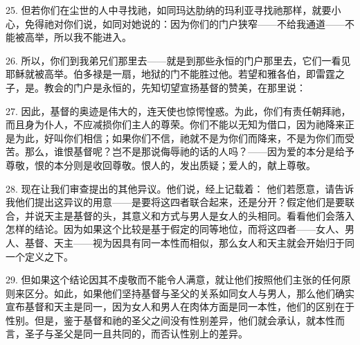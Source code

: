 25. 但若你们在尘世的人中寻找祂，如同玛达肋纳的玛利亚寻找祂那样，就要小心，免得祂对你们说，如同对她说的：因为你们的门户狭窄——不给我通道——不能被高举，所以我不能进入。\par

26. 所以，你们到我弟兄们那里去——就是到那些永恒的门户那里去，它们一看见耶稣就被高举。伯多禄是一扇，地狱的门不能胜过他。若望和雅各伯，即雷霆之子，是。教会的门户是永恒的，先知切望宣扬基督的赞美，在那里说：\par

27. 因此，基督的奥迹是伟大的，连天使也惊愕惶惑。为此，你们有责任朝拜祂，而且身为仆人，不应减损你们主人的尊荣。你们不能以无知为借口，因为祂降来正是为此，好叫你们相信；如果你们不信，祂就不是为你们而降来，不是为你们而受苦。那么，谁恨基督呢？岂不是那说侮辱祂的话的人吗？——因为爱的本分是给予尊敬，恨的本分则是收回尊敬。恨人的，发出质疑；爱人的，献上尊敬。\par

\par

28. 现在让我们审查提出的其他异议。他们说，经上记载着：  他们若愿意，请告诉我他们提出这异议的用意——是要将这四者联合起来，还是分开？假定他们是要联合，并说天主是基督的头，其意义和方式与男人是女人的头相同。看看他们会落入怎样的结论。因为如果这个比较是基于假定的同等地位，而将这四者——女人、男人、基督、天主——视为因具有同一本性而相似，那么女人和天主就会开始归于同一个定义之下。\par

29. 但如果这个结论因其不虔敬而不能令人满意，就让他们按照他们主张的任何原则来区分。如此，如果他们坚持基督与圣父的关系如同女人与男人，那么他们确实宣布基督和天主是同一，因为女人和男人在肉体方面是同一本性，他们的区别在于性别。但是，鉴于基督和祂的圣父之间没有性别差异，他们就会承认，就本性而言，圣子与圣父是同一且共同的，而否认性别上的差异。\par

